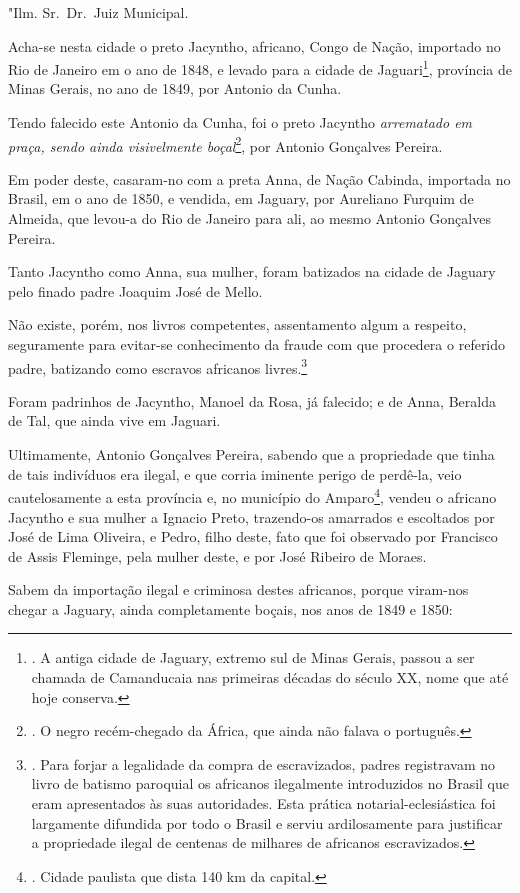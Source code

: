 "Ilm. Sr.~Dr.~Juiz Municipal.

Acha-se nesta cidade o preto Jacyntho, africano, Congo de Nação,
importado no Rio de Janeiro em o ano de 1848, e levado para a cidade de
Jaguari\footnote{. A antiga cidade de Jaguary, extremo sul de Minas
  Gerais, passou a ser chamada de Camanducaia nas primeiras décadas do
  século XX, nome que até hoje conserva.}, província de Minas Gerais, no
ano de 1849, por Antonio da Cunha.

Tendo falecido este Antonio da Cunha, foi o preto Jacyntho
\emph{arrematado em praça, sendo ainda visivelmente boçal}\footnote{. O
  negro recém-chegado da África, que ainda não falava o português.}, por
Antonio Gonçalves Pereira.

Em poder deste, casaram-no com a preta Anna, de Nação Cabinda, importada
no Brasil, em o ano de 1850, e vendida, em Jaguary, por Aureliano
Furquim de Almeida, que levou-a do Rio de Janeiro para ali, ao mesmo
Antonio Gonçalves Pereira.

Tanto Jacyntho como Anna, sua mulher, foram batizados na cidade de
Jaguary pelo finado padre Joaquim José de Mello.

Não existe, porém, nos livros competentes, assentamento algum a
respeito, seguramente para evitar-se conhecimento da fraude com que
procedera o referido padre, batizando como escravos africanos
livres.\footnote{. Para forjar a legalidade da compra de escravizados,
  padres registravam no livro de batismo paroquial os africanos
  ilegalmente introduzidos no Brasil que eram apresentados às suas
  autoridades. Esta prática notarial-eclesiástica foi largamente
  difundida por todo o Brasil e serviu ardilosamente para justificar a
  propriedade ilegal de centenas de milhares de africanos escravizados.}

Foram padrinhos de Jacyntho, Manoel da Rosa, já falecido; e de Anna,
Beralda de Tal, que ainda vive em Jaguari.

Ultimamente, Antonio Gonçalves Pereira, sabendo que a propriedade que
tinha de tais indivíduos era ilegal, e que corria iminente perigo de
perdê-la, veio cautelosamente a esta província e, no município do
Amparo\footnote{. Cidade paulista que dista 140 km da capital.}, vendeu
o africano Jacyntho e sua mulher a Ignacio Preto, trazendo-os amarrados
e escoltados por José de Lima Oliveira, e Pedro, filho deste, fato que
foi observado por Francisco de Assis Fleminge, pela mulher deste, e por
José Ribeiro de Moraes.

Sabem da importação ilegal e criminosa destes africanos, porque
viram-nos chegar a Jaguary, ainda completamente boçais, nos anos de 1849
e 1850:

